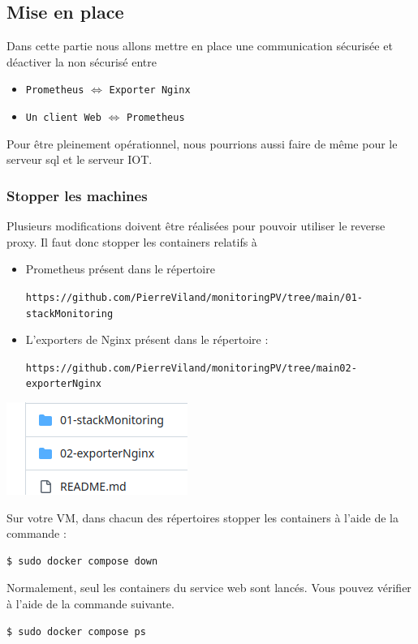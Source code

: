 \documentclass[french, 12pt]{article}%
\newcommand{\itemE}{\item[$\bullet$]}
\begin{document}
\subsection{Mise en place}

Dans cette partie nous allons mettre en place une communication sécurisée et déactiver la non sécurisé  entre 
\begin{itemize}
\itemE \verb?Prometheus? $\Leftrightarrow$ \verb?Exporter Nginx?
\itemE \verb?Un client Web? $\Leftrightarrow$ \verb?Prometheus?
\end{itemize}

Pour être pleinement opérationnel, nous pourrions aussi faire de même pour le serveur sql et le serveur IOT. 


\subsubsection{Stopper les machines}

Plusieurs modifications doivent être réalisées pour pouvoir utiliser le reverse proxy. Il faut donc stopper les containers relatifs à 
\begin{itemize}
\itemE Prometheus  présent dans le répertoire 

\verb?https://github.com/PierreViland/monitoringPV/tree/main/01-stackMonitoring?
\itemE L'exporters de Nginx présent dans le répertoire : 

 \verb?https://github.com/PierreViland/monitoringPV/tree/main02-exporterNginx?
\end{itemize}

\begin{center}
\includegraphics[scale=0.5]{./ressource/repMonitoring}
\end{center}

Sur votre VM, dans chacun des répertoires stopper les containers à l'aide de la commande : 

\begin{lstlisting}[style=commande] 
$ sudo docker compose down
\end{lstlisting} 

Normalement, seul les containers du service web sont lancés. Vous pouvez vérifier à l'aide  de la commande suivante.
\begin{lstlisting}[style=commande] 
$ sudo docker compose ps
\end{lstlisting} 
\end{document}
